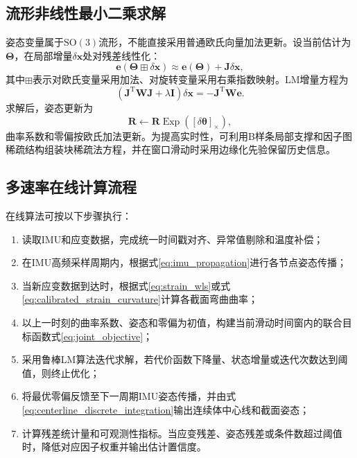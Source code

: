 \subsection{流形非线性最小二乘求解}

姿态变量属于$\mathrm{SO}(3)$流形，不能直接采用普通欧氏向量加法更新。设当前估计为$\bm\Theta$，在局部增量$\delta\bm x$处对残差线性化：
\begin{equation}
    \bm e(\bm\Theta\boxplus\delta\bm x)
    \approx \bm e(\bm\Theta)+\bm J\delta\bm x,
\end{equation}
其中$\boxplus$表示对欧氏变量采用加法、对旋转变量采用右乘指数映射。LM增量方程为
\begin{equation}
    \left(\bm J^{\mathrm T}\bm W\bm J+\lambda\bm I\right)
    \delta\bm x
    =-\bm J^{\mathrm T}\bm W\bm e.
    \label{eq:lm_normal_equation}
\end{equation}
求解后，姿态更新为
\begin{equation}
    \bm R\leftarrow
    \bm R\operatorname{Exp}([\delta\bm\theta]_{\times}),
\end{equation}
曲率系数和零偏按欧氏加法更新。为提高实时性，可利用B样条局部支撑和因子图稀疏结构组装块稀疏法方程，并在窗口滑动时采用边缘化先验保留历史信息。

\subsection{多速率在线计算流程}

在线算法可按以下步骤执行：

\begin{enumerate}
    \item 读取IMU和应变数据，完成统一时间戳对齐、异常值剔除和温度补偿；
    \item 在IMU高频采样周期内，根据式\eqref{eq:imu_propagation}进行各节点姿态传播；
    \item 当新应变数据到达时，根据式\eqref{eq:strain_wls}或式\eqref{eq:calibrated_strain_curvature}计算各截面弯曲曲率；
    \item 以上一时刻的曲率系数、姿态和零偏为初值，构建当前滑动时间窗内的联合目标函数式\eqref{eq:joint_objective}；
    \item 采用鲁棒LM算法迭代求解，若代价函数下降量、状态增量或迭代次数达到阈值，则终止优化；
    \item 将最优零偏反馈至下一周期IMU姿态传播，并由式\eqref{eq:centerline_discrete_integration}输出连续体中心线和截面姿态；
    \item 计算残差统计量和可观测性指标。当应变残差、姿态残差或条件数超过阈值时，降低对应因子权重并输出估计置信度。
\end{enumerate}

